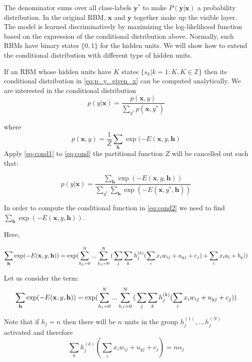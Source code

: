 \documentclass[review]{elsarticle}
\begin{document}
The denominator sums over all class-labels $\mathbf{y}^*$ to make
$P(\mathbf{y} |\mathbf{x})$ a probability distribution.  In the
original RBM, $\mathbf{x}$ and $\mathbf{y}$ together make up the
visible layer.  The model is learned discriminatively by maximizing
the log-likelihood function based on the expression of the conditional
distribution above. Normally, such RBMs have binary states $\{0,1\}$
for the hidden units. We will show how to extend the conditional
distribution with different type of hidden units.

If an RBM whose hidden units have $K$ states $\{s_k|k=1:K, K \in \mathbb{Z}\}$ then its
conditional distribution in \eqref{eq:p_y_given_x} can be computed
analytically. We are interested in the conditional distribution
\begin{equation}
\label{eq:cond}
p(y|\mathbf{x}) = \frac{p(\mathbf{x},y)}{\sum_{y^*} p(\mathbf{x},y^*)}
\end{equation}

where 
\begin{equation}
\label{eq:cond1}
  p(\mathbf{x},y) = \frac{1}{Z}\sum_\mathbf{h}\exp(-E(\mathbf{x},y,\mathbf{h})
\end{equation}
Apply \eqref{eq:cond1} to \eqref{eq:cond} the partitional function $Z$
will be cancelled out such that:

\begin{equation}
\label{eq:cond2}
p(y|\mathbf{x}) = \frac{\sum_\mathbf{h}\exp(-E(\mathbf{x},y,\mathbf{h}))}{\sum_{y^*}\sum_\mathbf{h}\exp(-E(\mathbf{x},y^*,\mathbf{h}))}
\end{equation}

In order to compute the conditional function in \eqref{eq:cond2} we
need to find $\sum_\mathbf{h}\exp(-E(\mathbf{x},y,\mathbf{h}))$.

Here,

\begin{equation}
  \sum_\mathbf{h}\exp(-E(\mathbf{x},y,\mathbf{h})) = \exp(\sum_{h_1=0}^N ... \sum_{h_J=0}^N \large{(}\sum_{j}\sum_k h^{(k)}_j (\sum_i x_iw_{ij} + u_{yj} + c_j) + \sum_i x_i a_i + b_y \large{)})
\end{equation}

Let us consider the term:
\begin{equation}
  \sum_\mathbf{h}\exp(-E(\mathbf{x},y,\mathbf{h})) = \exp(\sum_{h_1=0}^N ... \sum_{h_J=0}^N \large{(}\sum_{j}\sum_k h^{(k)}_j (\sum_i x_iw_{ij} + u_{yj} + c_j))
\end{equation}

Note that if $h_j = n$ then there will be $n$ units in the group $h_j^{(1)}, ..,h_j^{(N)}$ activated and therefore 
\begin{equation}
\sum_k h^{(k)}_j (\sum_i x_iw_{ij} + u_{yj} + c_j) = n\alpha_j 
\end{equation}
\end{document}
